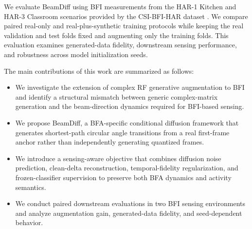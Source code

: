 We evaluate BeamDiff using BFI measurements from the HAR-1 Kitchen and HAR-3
Classroom scenarios provided by the CSI-BFI-HAR dataset
\cite{haque2026datasets}. We compare paired real-only and real-plus-synthetic
training protocols while keeping the real validation and test folds fixed and
augmenting only the training folds. This evaluation examines generated-data
fidelity, downstream sensing performance, and robustness across model
initialization seeds.

The main contributions of this work are summarized as follows:

\begin{itemize}
    \item We investigate the extension of complex RF generative augmentation to
    BFI and identify a structural mismatch between generic complex-matrix
    generation and the beam-direction dynamics required for BFI-based sensing.

    \item We propose BeamDiff, a BFA-specific conditional diffusion framework
    that generates shortest-path circular angle transitions from a real
    first-frame anchor rather than independently generating quantized frames.

    \item We introduce a sensing-aware objective that combines diffusion noise
    prediction, clean-delta reconstruction, temporal-fidelity regularization, and
    frozen-classifier supervision to preserve both BFA dynamics and activity
    semantics.

    \item We conduct paired downstream evaluations in two BFI sensing
    environments and analyze augmentation gain, generated-data fidelity, and
    seed-dependent behavior.
\end{itemize}

